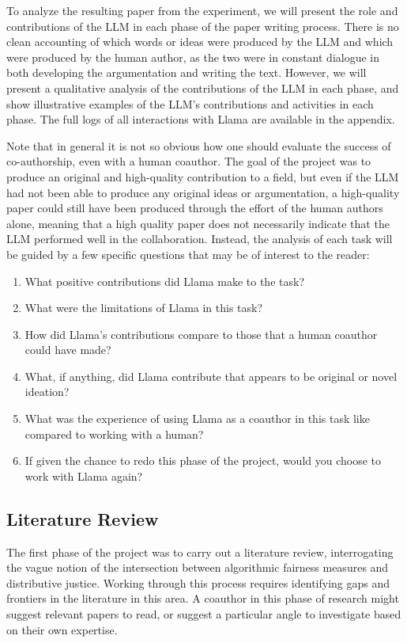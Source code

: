 To analyze the resulting paper from the experiment, we will present the role and
contributions of the LLM in each phase of the paper writing process. There is no
clean accounting of which words or ideas were produced by the LLM and which were
produced by the human author, as the two were in constant dialogue in both
developing the argumentation and writing the text. However, we will present a 
qualitative analysis of the contributions of the LLM in each phase, and show
illustrative examples of the LLM's contributions and activities in each phase.
The full logs of all interactions with Llama are available in the appendix.

Note that in general it is not so obvious how one should evaluate the success of
co-authorship, even with a human coauthor. The goal of the project was to
produce an original and high-quality contribution to a field, but even if the 
LLM had not been able to produce any original ideas or argumentation, a
high-quality paper could still have been produced through the effort of the 
human authors alone, meaning that a high quality paper does not necessarily
indicate that the LLM performed well in the collaboration. Instead, the analysis
of each task will be guided by a few  specific questions that may be of interest
to the reader:
\begin{enumerate}
    \item What positive contributions did Llama make to the task?
    \item What were the limitations of Llama in this task?
    \item How did Llama's contributions compare to those that a human coauthor
          could have made?
    \item What, if anything, did Llama contribute that appears to be original
          or novel ideation?
    \item What was the experience of using Llama as a coauthor in this task
          like compared to working with a human?
    \item If given the chance to redo this phase of the project, would you
          choose to work with Llama again?
\end{enumerate}

\subsection{Literature Review}

The first phase of the project was to carry out a literature review,
interrogating the vague notion of the intersection between algorithmic fairness
measures and distributive justice. Working through this process requires
identifying gaps and frontiers in the literature in this area. A coauthor in
this phase of research might suggest relevant papers to read, or suggest a
particular angle to investigate based on their own expertise.

